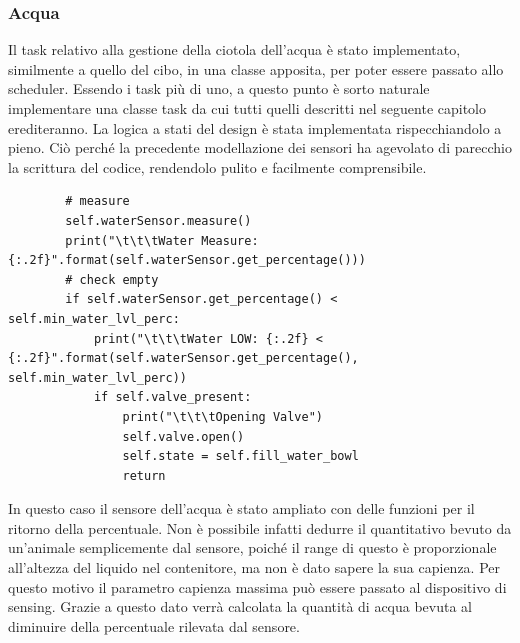     \subsubsection{Acqua}
    Il task relativo alla gestione della ciotola dell'acqua è stato implementato, similmente a quello del cibo, in una classe apposita, per poter essere passato allo scheduler. Essendo i task più di uno, a questo punto è sorto naturale implementare una classe task da cui tutti quelli descritti nel seguente capitolo erediteranno.
    La logica a stati del design è stata implementata rispecchiandolo a pieno. Ciò perché la precedente modellazione dei sensori ha agevolato di parecchio la scrittura del codice, rendendolo pulito e facilmente comprensibile. 
    \begin{lstlisting} 
        # measure
        self.waterSensor.measure()
        print("\t\t\tWater Measure:  {:.2f}".format(self.waterSensor.get_percentage()))
        # check empty
        if self.waterSensor.get_percentage() < self.min_water_lvl_perc:
            print("\t\t\tWater LOW: {:.2f} < {:.2f}".format(self.waterSensor.get_percentage(), self.min_water_lvl_perc))
            if self.valve_present:
                print("\t\t\tOpening Valve")
                self.valve.open()
                self.state = self.fill_water_bowl
                return
    \end{lstlisting}
    In questo caso il sensore dell'acqua è stato ampliato con delle funzioni per il ritorno della percentuale. Non è possibile infatti dedurre il quantitativo bevuto da un'animale semplicemente dal sensore, poiché il range di questo è proporzionale all'altezza del liquido nel contenitore, ma non è dato sapere la sua capienza. Per questo motivo il parametro capienza massima può essere passato al dispositivo di sensing. Grazie a questo dato verrà calcolata la quantità di acqua bevuta al diminuire della percentuale rilevata dal sensore.
    
